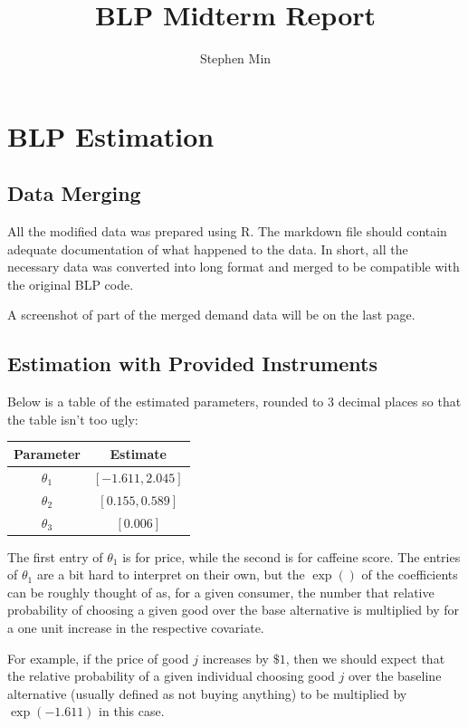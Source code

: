 \documentclass[12pt, letterpaper]{article}
\title{BLP Midterm Report}
\author{Stephen Min}
\date{}
\theoremstyle{definition}
\theoremstyle{remark}
\theoremstyle{definition}
\begin{document}
\maketitle

\section{BLP Estimation}
\subsection{Data Merging}
All the modified data was prepared using R. The markdown file should contain adequate documentation of what happened to the data. In short, all the necessary data was converted into long format and merged to be compatible with the original BLP code.

A screenshot of part of the merged demand data will be on the last page.

\subsection{Estimation with Provided Instruments}
Below is a table of the estimated parameters, rounded to 3 decimal places so that the table isn't too ugly:

\begin{table}[ht]
    \centering
    \begin{tabular}{|c|c|}
        \hline
        \textbf{Parameter} & \textbf{Estimate} \\ \hline
        $\theta_1$  & $[-1.611, 2.045]$ \\ \hline
        $\theta_2$  & $[0.155, 0.589]$ \\ \hline
        $\theta_3$  & $[0.006]$ \\ \hline
    \end{tabular}
\end{table}

The first entry of $\theta_1$ is for price, while the second is for caffeine score. The entries of $\theta_1$ are a bit hard to interpret on their own, but the $\exp()$ of the coefficients can be roughly thought of as, for a given consumer, the number that relative probability of choosing a given good over the base alternative is multiplied by for a one unit increase in the respective covariate. 

For example, if the price of good $j$ increases by $\$1$, then we should expect that the relative probability of a given individual choosing good $j$ over the baseline alternative (usually defined as not buying anything) to be multiplied by $\exp(-1.611)$ in this case. 
\end{document}
